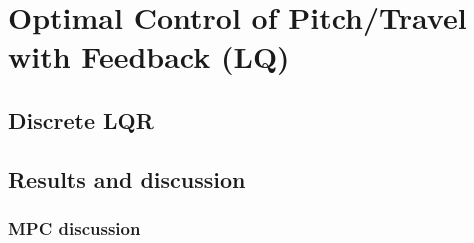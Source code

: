 \section{Optimal Control of Pitch/Travel with Feedback (LQ)}\label{sec:prob3}

\subsection{Discrete LQR}

\subsection{Results and discussion}

\subsubsection{MPC discussion}
